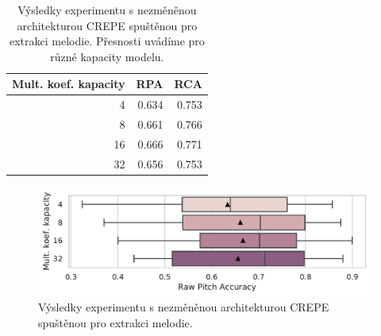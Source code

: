 \begin{table}[h!]

\centering

\begin{tabular}{rrr}
\toprule
Mult. koef. kapacity &   RPA &   RCA \\
\midrule
                   4 & 0.634 & 0.753 \\
                   8 & 0.661 & 0.766 \\
                  16 & 0.666 & 0.771 \\
                  32 & 0.656 & 0.753 \\
\bottomrule
\end{tabular}
\caption{Výsledky experimentu s nezměněnou architekturou CREPE spuštěnou pro extrakci melodie. Přesnosti uvádíme pro různé kapacity modelu.}\label{tab:crepe_capacity_experiment}
\end{table}

\begin{figure}[h]\centering
    \includegraphics[scale=0.6]{../img/figures/crepe_kapacita.pdf}
\caption{Výsledky experimentu s nezměněnou architekturou CREPE spuštěnou pro extrakci melodie.}
\label{obr:crepe_capacity_experiment}
\end{figure}

